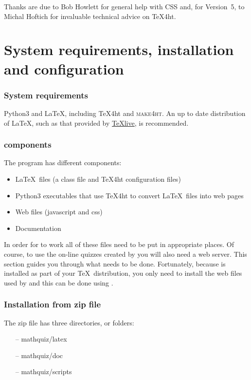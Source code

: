 \documentclass[svgnames]{article}
\newif\ifCtan\Ctanfalse %
\begin{document}
   Thanks are due to Bob Howlett for general help with CSS and, for
   Version~5, to  Michal Hoftich for invaluable technical advice on
   \TeX4ht.

\section{System requirements, installation and configuration}

  \subsubsection{System requirements} Python3 and \LaTeX, including \TeX 4ht
  and \textsc{make4ht}. An up to date distribution of \LaTeX, such as
  that provided by \href{https://www.tug.org/texlive/}{\TeX live}, is recommended.


  \subsubsection{\MathQuiz components}

  The \MathQuiz program has different components:
    \begin{itemize}
         \item \LaTeX\ files (a class file and \TeX4ht configuration files)
         \item Python3 executables that use \TeX4ht to convert \LaTeX\ files into web pages
         \item Web files (javascript and css)
         \item Documentation
    \end{itemize}
  In order for \MathQuiz to work all of these files need to be put in
  appropriate places. Of course, to use the on-line quizzes created by
  \MathQuiz you will also need a web server.  This section guides you
  through what needs to be done.
  \ifCtan
     Fortunately, because \MathQuiz is installed as part of your \TeX\
     distribution, you only need to install the web files used by \MathQuiz
     and this can be done using \MathQuiz.

  \else

  \subsubsection{Installation from zip file}
    The \MathQuiz zip file has three directories, or folders:

    \begin{itemize}
      \item[--] mathquiz/latex
      \item[--] mathquiz/doc
      \item[--] mathquiz/scripts
    \end{itemize}
\end{document}
